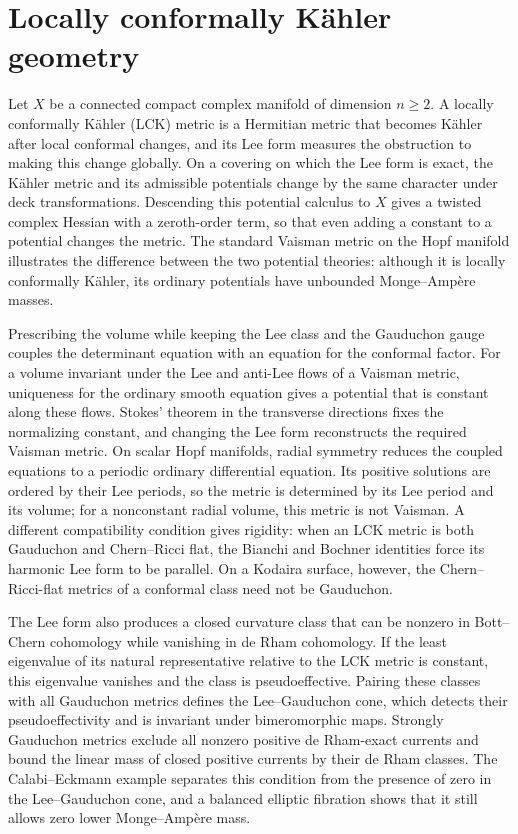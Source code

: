 \chapter{Locally conformally K\"ahler geometry}
\label{chap:lck}

\begingroup
{}

Let $X$ be a connected compact complex manifold of dimension $n\geq2$. A locally conformally K\"ahler (LCK) metric is a Hermitian metric that becomes K\"ahler after local conformal changes, and its Lee form measures the obstruction to making this change globally. On a covering on which the Lee form is exact, the K\"ahler metric and its admissible potentials change by the same character under deck transformations. Descending this potential calculus to $X$ gives a twisted complex Hessian with a zeroth-order term, so that even adding a constant to a potential changes the metric. The standard Vaisman metric on the Hopf manifold illustrates the difference between the two potential theories: although it is locally conformally K\"ahler, its ordinary potentials have unbounded Monge--Amp\`ere masses.

Prescribing the volume while keeping the Lee class and the Gauduchon gauge couples the determinant equation with an equation for the conformal factor. For a volume invariant under the Lee and anti-Lee flows of a Vaisman metric, uniqueness for the ordinary smooth equation gives a potential that is constant along these flows. Stokes' theorem in the transverse directions fixes the normalizing constant, and changing the Lee form reconstructs the required Vaisman metric. On scalar Hopf manifolds, radial symmetry reduces the coupled equations to a periodic ordinary differential equation. Its positive solutions are ordered by their Lee periods, so the metric is determined by its Lee period and its volume; for a nonconstant radial volume, this metric is not Vaisman. A different compatibility condition gives rigidity: when an LCK metric is both Gauduchon and Chern--Ricci flat, the Bianchi and Bochner identities force its harmonic Lee form to be parallel. On a Kodaira surface, however, the Chern--Ricci-flat metrics of a conformal class need not be Gauduchon.

The Lee form also produces a closed curvature class that can be nonzero in Bott--Chern cohomology while vanishing in de Rham cohomology. If the least eigenvalue of its natural representative relative to the LCK metric is constant, this eigenvalue vanishes and the class is pseudoeffective. Pairing these classes with all Gauduchon metrics defines the Lee--Gauduchon cone, which detects their pseudoeffectivity and is invariant under bimeromorphic maps. Strongly Gauduchon metrics exclude all nonzero positive de Rham-exact currents and bound the linear mass of closed positive currents by their de Rham classes. The Calabi--Eckmann example separates this condition from the presence of zero in the Lee--Gauduchon cone, and a balanced elliptic fibration shows that it still allows zero lower Monge--Amp\`ere mass.


